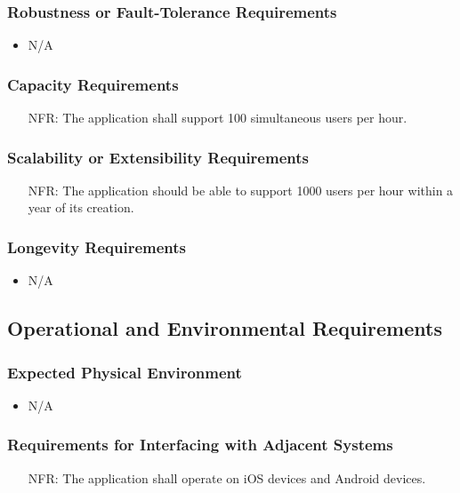 \documentclass[12pt]{article}
\newcounter{nfrnum} %
\begin{document}
  \subsubsection{Robustness or Fault-Tolerance Requirements}
    \noindent\begin{itemize}
		\item N/A
    \end{itemize}
  \subsubsection{Capacity Requirements}
    \noindent\begin{itemize}
      \item[NFR\refstepcounter{nfrnum}\thenfrnum:] 
        The application shall support 100 simultaneous users per hour. 
    \end{itemize}
  \subsubsection{Scalability or Extensibility Requirements}
    \noindent\begin{itemize}
      \item[NFR\refstepcounter{nfrnum}\thenfrnum:] 
        The application should be able to support 1000 users per hour within a year of its creation.
    \end{itemize}
  \subsubsection{Longevity Requirements}
    \noindent\begin{itemize}
		\item N/A
    \end{itemize}

\subsection{Operational and Environmental Requirements}
  \subsubsection{Expected Physical Environment}
    \noindent\begin{itemize}
		\item N/A
    \end{itemize}
  \subsubsection{Requirements for Interfacing with Adjacent Systems}
    \noindent\begin{itemize}
      \item[NFR\refstepcounter{nfrnum}\thenfrnum:] 
        The application shall operate on iOS devices and Android devices.
    \end{itemize}  
\end{document}
